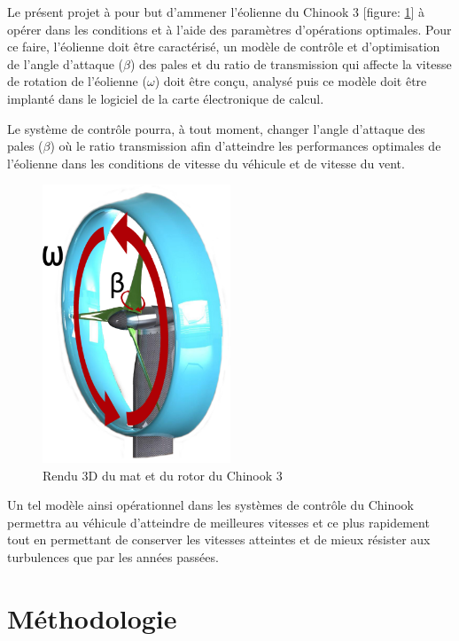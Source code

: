 \documentclass[11pt]{article}
\begin{document}
Le présent projet à pour but d'ammener l'éolienne du Chinook 3 [figure: \ref{fig:matRotor}] à opérer dans les conditions et à l'aide des paramètres d'opérations optimales. Pour ce faire, l'éolienne doit être caractérisé, un modèle de contrôle et d'optimisation de l'angle d'attaque ($\beta$) des pales et du ratio de transmission qui affecte la vitesse de rotation de l'éolienne ($\omega$) doit être conçu, analysé puis ce modèle doit être implanté dans le logiciel de la carte électronique de calcul.

Le système de contrôle pourra, à tout moment, changer l'angle d'attaque des pales ($\beta$) où le ratio transmission afin d'atteindre les performances optimales de l'éolienne dans les conditions de vitesse du véhicule et de vitesse du vent.


\begin{figure}[H]
  \centering
  \includegraphics[width=0.5\textwidth]{images/matetrotorrotationnel.jpg}
  \caption[Mat et Rotor du Chinook 3]{Rendu 3D du mat et du rotor du Chinook 3}
  \label{fig:matRotor}
\end{figure}

Un tel modèle ainsi opérationnel dans les systèmes de contrôle du Chinook permettra au véhicule d'atteindre de meilleures vitesses et ce plus rapidement tout en permettant de conserver les vitesses atteintes et de mieux résister aux turbulences que par les années passées.

\section{Méthodologie}
\end{document}
